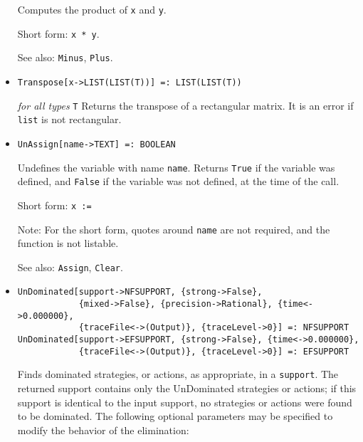 \begin{itemize}
\bd
Computes the product of \verb+x+ and \verb+y+.
\item [Short form:] \verb+x * y+.
\item [See also:] \verb+Minus+, \verb+Plus+.
\ed

\item{}
\protect \large \begin{verbatim} 
Transpose[x->LIST(LIST(T))] =: LIST(LIST(T)) 
\end{verbatim}\normalsize

{\it for all types} {\tt T}
\bd
Returns the transpose of a rectangular matrix.  It is an error if \verb+list+
is not rectangular.
\ed



\item{}
\protect \large \begin{verbatim}
UnAssign[name->TEXT] =: BOOLEAN
\end{verbatim}\normalsize

\bd
Undefines the variable with name \verb+name+.  Returns 
\verb+True+ if the variable was defined, and \verb+False+ if the
variable was not defined, at the time of the call.
\item [Short form:] \verb+x := +
\item [Note:] For the short form, quotes around \verb+name+ are not
required, and the function is not listable.
\item [See also:] \verb+Assign+, \verb+Clear+.
\ed

\item{}
\protect \large \begin{verbatim}
UnDominated[support->NFSUPPORT, {strong->False}, 
            {mixed->False}, {precision->Rational}, {time<->0.000000}, 
            {traceFile<->(Output)}, {traceLevel->0}] =: NFSUPPORT 
UnDominated[support->EFSUPPORT, {strong->False}, {time<->0.000000}, 
            {traceFile<->(Output)}, {traceLevel->0}] =: EFSUPPORT 
\end{verbatim}\normalsize

\bd
Finds dominated strategies, or actions, as appropriate, in a 
\verb+support+.  The returned support contains only the UnDominated
strategies or actions; if this support is identical to the input support,
no strategies or actions were found to be dominated.  The following
optional parameters may be specified to modify the behavior of
the elimination:


\end{itemize}
